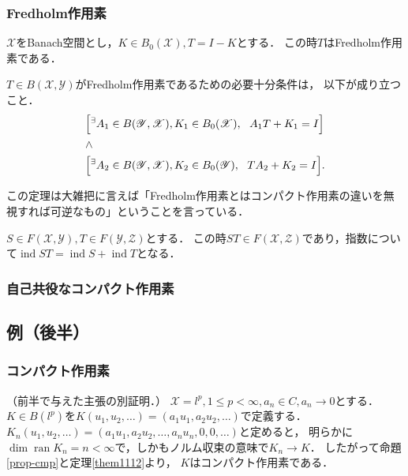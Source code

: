 \documentclass[a4j]{jsarticle}
\newcommand{\ran}{\operatorname{ran}}
\newcommand{\ind}{\operatorname{ind}}
\newcommand{\spX}{\mathscr{X}}
\newcommand{\spY}{\mathscr{Y}}
\newcommand{\spZ}{\mathscr{Z}}
\begin{document}
    \subsubsection{Fredholm作用素}
    \begin{Thm}[定理11.20, p.262] \label{them1120}
        $\spX$をBanach空間とし，$K \in B_0(\spX), T=I-K$とする．
        この時$T$はFredholm作用素である．
    \end{Thm}
    \begin{Thm}[定理11.24, p.264] \label{them1124}
        $T \in B(\spX,\spY)$がFredholm作用素であるための必要十分条件は，
        以下が成り立つこと．
        \begin{align*}
            &\Big[\Exists{A_1 \in B(\spY,\spX), K_1 \in B_0(\spX)} A_1 T+K_1=I \Big] \\
            &\land \\
            &\Big[\Exists{A_2 \in B(\spY,\spX), K_2 \in B_0(\spY)} T A_2+K_2=I \Big]
            .
        \end{align*}
    \end{Thm}
    この定理は大雑把に言えば「Fredholm作用素とはコンパクト作用素の違いを無視すれば可逆なもの」ということを言っている．

    \begin{Thm}[定理11.25, p.265] \label{them1125}
        $S \in F(\spX, \spY), T \in F(\spY,\spZ)$とする．
        この時$ST \in F(\spX,\spZ)$であり，指数について$\ind ST=\ind S+\ind T$となる．
    \end{Thm}

    \subsubsection{自己共役なコンパクト作用素}

    \subsection{例（後半）}
    \subsubsection{コンパクト作用素}
    \begin{Example}[問, p.258]
        （前半で与えた主張の別証明．）
        $\spX=l^p, 1 \leq p<\infty, a_n \in C, a_n \to 0$とする．
        $K \in B(l^p)$を$K(u_1,u_2,\dots)=(a_1u_1,a_2u_2,\dots)$で定義する．
        $K_n(u_1,u_2,\dots)=(a_1u_1,a_2u_2,\dots,a_nu_n,0,0,\dots)$と定めると，
        明らかに$\dim \ran K_n=n<\infty$で，しかもノルム収束の意味で$K_n \to K$．
        したがって命題\ref{prop-cmp}と定理\ref{them1112}より，
        $K$はコンパクト作用素である．
    \end{Example}
\end{document}
